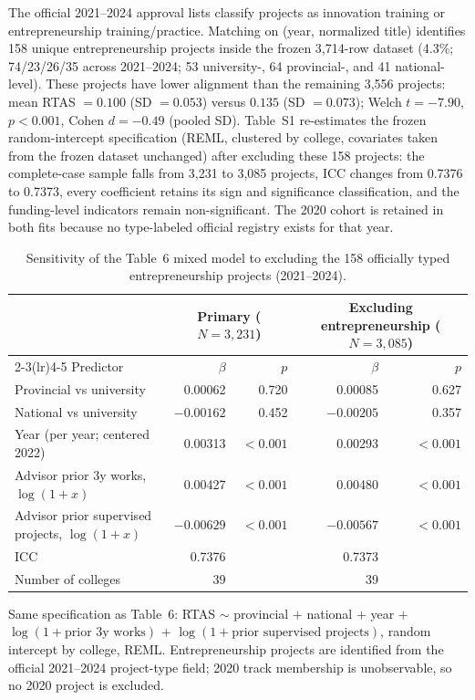 \documentclass[11pt]{article}
\begin{document}
The official 2021--2024 approval lists classify projects as innovation training or entrepreneurship training/practice. Matching on (year, normalized title) identifies 158 unique entrepreneurship projects inside the frozen 3,714-row dataset (4.3\%; 74/23/26/35 across 2021--2024; 53 university-, 64 provincial-, and 41 national-level). These projects have lower alignment than the remaining 3,556 projects: mean RTAS $=0.100$ (SD $=0.053$) versus $0.135$ (SD $=0.073$); Welch $t=-7.90$, $p<0.001$, Cohen $d=-0.49$ (pooled SD). Table~S1 re-estimates the frozen random-intercept specification (REML, clustered by college, covariates taken from the frozen dataset unchanged) after excluding these 158 projects: the complete-case sample falls from 3,231 to 3,085 projects, ICC changes from 0.7376 to 0.7373, every coefficient retains its sign and significance classification, and the funding-level indicators remain non-significant. The 2020 cohort is retained in both fits because no type-labeled official registry exists for that year.

\begin{table}[H]
\centering
\caption{Sensitivity of the Table~6 mixed model to excluding the 158 officially typed entrepreneurship projects (2021--2024).}
\label{tab:s1}
\begin{tabular}{lrrrr}
\toprule
& \multicolumn{2}{c}{Primary ($N=3{,}231$)} & \multicolumn{2}{c}{Excluding entrepreneurship ($N=3{,}085$)}\\
\cmidrule(lr){2-3}\cmidrule(lr){4-5}
Predictor & $\beta$ & $p$ & $\beta$ & $p$\\
\midrule
Provincial vs university & 0.00062 & 0.720 & 0.00085 & 0.627\\
National vs university & $-0.00162$ & 0.452 & $-0.00205$ & 0.357\\
Year (per year; centered 2022) & 0.00313 & $<0.001$ & 0.00293 & $<0.001$\\
Advisor prior 3y works, $\log(1+x)$ & 0.00427 & $<0.001$ & 0.00480 & $<0.001$\\
Advisor prior supervised projects, $\log(1+x)$ & $-0.00629$ & $<0.001$ & $-0.00567$ & $<0.001$\\
\midrule
ICC & 0.7376 & & 0.7373 & \\
Number of colleges & 39 & & 39 & \\
\bottomrule
\end{tabular}

\vspace{1mm}
\footnotesize Same specification as Table~6: RTAS $\sim$ provincial $+$ national $+$ year $+$ $\log(1+\text{prior 3y works})$ $+$ $\log(1+\text{prior supervised projects})$, random intercept by college, REML. Entrepreneurship projects are identified from the official 2021--2024 project-type field; 2020 track membership is unobservable, so no 2020 project is excluded.
\end{table}
\end{document}
